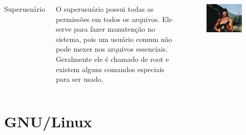\documentclass{beamer}
\begin{document}
\begin{frame}

	\begin{columns}

		{\huge Superusuário}

		O superusuário possui todas as permissões em todos os arquivos. Ele serve
		para fazer manutenção no sistema, pois um usuário comum não pode mexer nos
		arquivos essenciais.
		\newline
		\newline
		Geralmente ele é chamado de root e existem alguns comandos especiais para
		ser usado.


		\begin{figure}
			\includegraphics[scale=0.3]{images/rambo.jpg}
	  \end{figure}

	\end{columns}

\end{frame}

\section{GNU/Linux}
\end{document}
